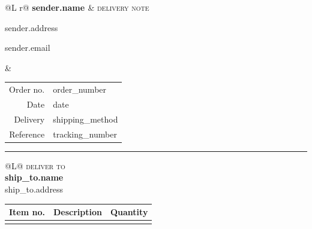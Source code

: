 \documentclass[10pt,a4paper]{article}
\newcommand{\fieldname}[1]{\textcolor{muted}{\footnotesize\scshape\MakeLowercase{#1}}}
\begin{document}
\color{ink}
{%
\begin{tabularx}{\linewidth}{@{}L r@{}}
  {\Large\bfseries\mbox{}{{ sender.name }}} & \textcolor{accent}{\fontsize{22}{24}\selectfont\scshape delivery note} \\[6pt]
  \parbox[t]{0.5\linewidth}{\raggedright\small\mbox{}{{ sender.address }}\par\mbox{}{{ sender.email }}} &
  {\small\begin{tabular}[t]{@{}r@{\hspace{8pt}}l@{}}
    \textcolor{muted}{Order no.} & {{ order_number }} \\
    \textcolor{muted}{Date} & {{ date }} \\
    \textcolor{muted}{Delivery} & {{ shipping_method }} \\
    \textcolor{muted}{Reference} & {{ tracking_number }} \\
  \end{tabular}}
\end{tabularx}

\vspace{10pt}
\textcolor{accent}{\rule{\linewidth}{0.8pt}}
\vspace{8pt}

\begin{tabularx}{\linewidth}{@{}L@{}}
  \fieldname{Deliver to} \\[2pt]
  {\bfseries\mbox{}{{ ship_to.name }}} \\
  {\small {{ ship_to.address }}}
\end{tabularx}

\vspace{18pt}
{\renewcommand{\arraystretch}{1.45}\setlength{\LTpre}{0pt}\setlength{\LTpost}{0pt}\setlength{\LTleft}{0pt}\setlength{\LTright}{0pt}
\begin{longtable}{@{}>{\raggedright\arraybackslash}p{30mm} >{\raggedright\arraybackslash}p{\dimexpr\linewidth-6\tabcolsep-30mm-18mm\relax} >{\raggedleft\arraybackslash}p{18mm}@{}}
  \toprule
  \textbf{Item no.} & \textbf{Description} & \textbf{Quantity} \\
  \midrule
\endhead
  \bottomrule
\endfoot
  \bottomrule
\endlastfoot
{%
{%

}}
\end{longtable}}}
\end{document}
